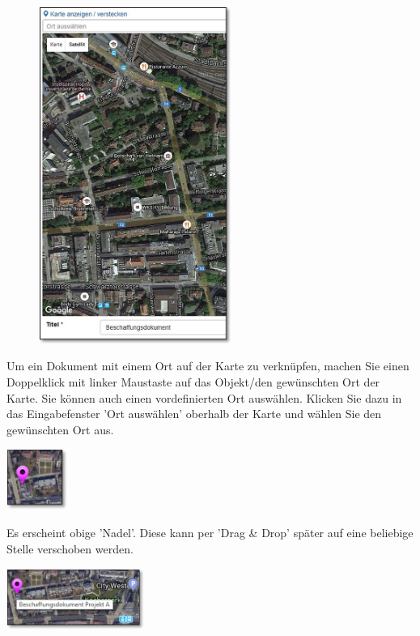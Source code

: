 \vspace{2mm}

\begin{figure}
\vspace{-15pt}
\includegraphics[height=110mm]{../chapters/11_Dokumentenablage/pictures/11-2-3_GoogleMap.jpg}
\end{figure}

Um ein Dokument mit einem Ort auf der Karte zu verknüpfen, machen Sie einen Doppelklick mit linker Maustaste auf das Objekt/den gewünschten Ort der Karte. Sie können auch einen vordefinierten Ort auswählen. Klicken Sie dazu in das Eingabefenster 'Ort auswählen' oberhalb der Karte und wählen Sie den gewünschten Ort aus.

\vspace{4mm}

\hspace{15mm} \includegraphics[height=20mm]{../chapters/11_Dokumentenablage/pictures/11-2-3_GoogleMapNadel.jpg}

Es erscheint obige 'Nadel'. Diese kann per 'Drag \& Drop' später auf eine beliebige Stelle verschoben werden.

\hspace{15mm} \includegraphics[height=20mm]{../chapters/11_Dokumentenablage/pictures/11-2-3_GoogleMapText.jpg}

